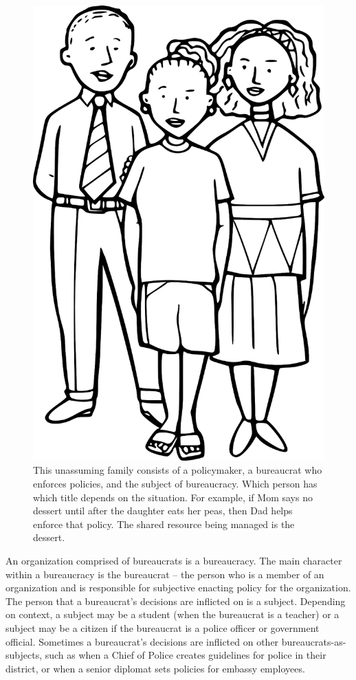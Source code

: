 \begin{figure}
    \centering
    \includegraphics[width=.6\textwidth]{images/family-father-mother-daughter-28725_1280_pixabay.png}
    \caption{This unassuming family consists of a policymaker, a bureaucrat who enforces policies, and the subject of bureaucracy. Which person has which title depends on the situation. For example, if Mom says no dessert until after the daughter eats her peas, then Dad helps enforce that policy. The shared resource being managed is the dessert. }
    \label{fig:family-of-bureaucrats}
\end{figure}

An organization comprised of bureaucrats is a \gls{bureaucracy}. \iftoggle{glossaryinmargin}{\marginpar{[Glossary]}}{}
The main character within a bureaucracy is the \gls{bureaucrat} -- the person who is a member of an organization and is responsible for subjective enacting policy for the organization. The person that a bureaucrat's decisions are inflicted on is a \gls{subject}.  Depending on context, a subject may be a student (when the bureaucrat is a teacher)
or a subject may be a citizen if the bureaucrat is a police officer 
or government official. Sometimes a bureaucrat's decisions are inflicted on other bureaucrats-as-subjects, such as when a Chief of Police creates guidelines for police in their district, or when a senior diplomat sets policies for embassy employees. 


